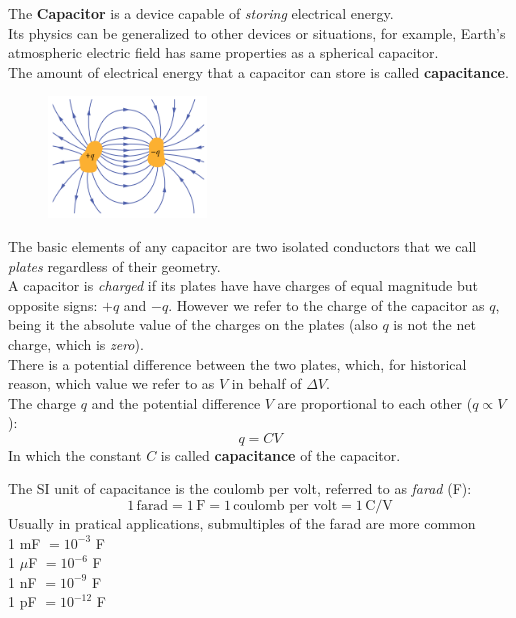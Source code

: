 \documentclass[12pt, a4paper]{article}
\begin{document}
		The \textbf{Capacitor} is a device capable of \textit{storing} electrical energy. \\
		Its physics can be generalized to other devices or situations, for example, Earth's atmospheric electric field has same properties as a spherical capacitor. \\
		The amount of electrical energy that a capacitor can store is called 
		\textbf{capacitance}.\\
		\begin{figure}
			\centering
			\includegraphics[width=4.2cm]{Physics2_PNGs/capacitor-scheme.png}
			\caption*{}
			\label{fig:capacitor-scheme.png}
		\end{figure}
		The basic elements of any capacitor are two isolated conductors that we call \textit{plates} regardless of their geometry. \\
		A capacitor is \textit{charged} if its plates have have charges of equal magnitude but opposite signs: $+q$ and $-q$. However we refer to the charge of the capacitor as $q$, being it the absolute value of the charges on the plates (also $q$ is not the net charge, which is \textit{zero}). \\
		There is a potential difference between the two plates, which, for historical reason, which value we refer to as $V$ in behalf of $\Delta V$. \\
		The charge $q$ and the potential difference $V$ are proportional to each other 
		($q \propto V$):
		\begin{equation*}
			q = CV
			\tag{5-1}
		\end{equation*}
		In which the constant $C$ is called \textbf{capacitance} of the capacitor.
		
		The SI unit of capacitance is the coulomb per volt, referred to as \textit{farad} (F):
		\[
			1 \, \text{farad} = 1 \, \text{F} = 1 \, \text{coulomb per volt} = 1 \,
			\text{C} / \text{V}
			\tag{5-2}
		\]
		Usually in pratical applications, submultiples of the farad are more common \\
		1 mF $= 10^{-3}$ F \\ 1 $\mu$F $= 10^{-6}$ F \\ 
		1 nF $= 10^{-9}$ F \\ 1 pF $= 10^{-12}$ F		
		
\end{document}
